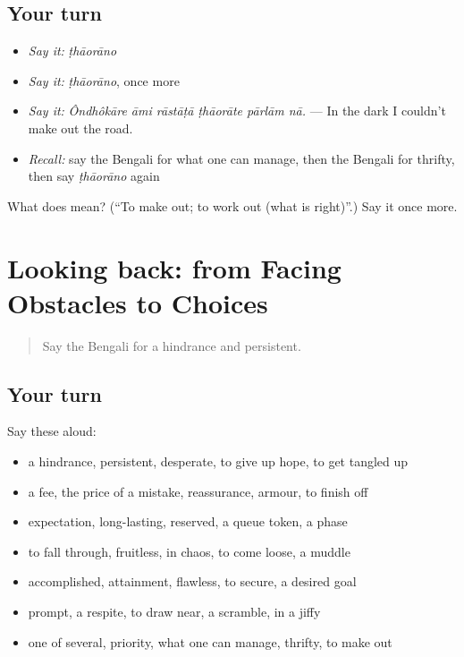 \subsection*{Your turn}
\begin{itemize}
\raggedright
  \item \emph{Say it:} \emph{ṭhāorāno}
  \item \emph{Say it:} \emph{ṭhāorāno}, once more
  \item \emph{Say it:} \emph{Ôndhôkāre āmi rāstāṭā ṭhāorāte pārlām nā.} — In the dark I couldn't make out the road.
  \item \emph{Recall:} say the Bengali for what one can manage, then the Bengali for thrifty, then say \emph{ṭhāorāno} again
\end{itemize}

\begin{tcolorbox}[breakable,colback=teal!4,colframe=teal!35!black,title={Before you move on}]
What does  mean? (\textquotedblleft{}To make out; to work out (what is right)\textquotedblright{}.) Say it once more.
\end{tcolorbox}
\section[(dialogue)]{Looking back: from Facing Obstacles to Choices}

\label{lesson:BN-R545-review-539-545}



\begin{quote}
Say the Bengali for a hindrance and persistent.
\end{quote}

\subsection*{Your turn}
Say these aloud:

\begin{itemize}
\raggedright
  \item a hindrance, persistent, desperate, to give up hope, to get tangled up
  \item a fee, the price of a mistake, reassurance, armour, to finish off
  \item expectation, long-lasting, reserved, a queue token, a phase
  \item to fall through, fruitless, in chaos, to come loose, a muddle
  \item accomplished, attainment, flawless, to secure, a desired goal
  \item prompt, a respite, to draw near, a scramble, in a jiffy
  \item one of several, priority, what one can manage, thrifty, to make out
\end{itemize}

